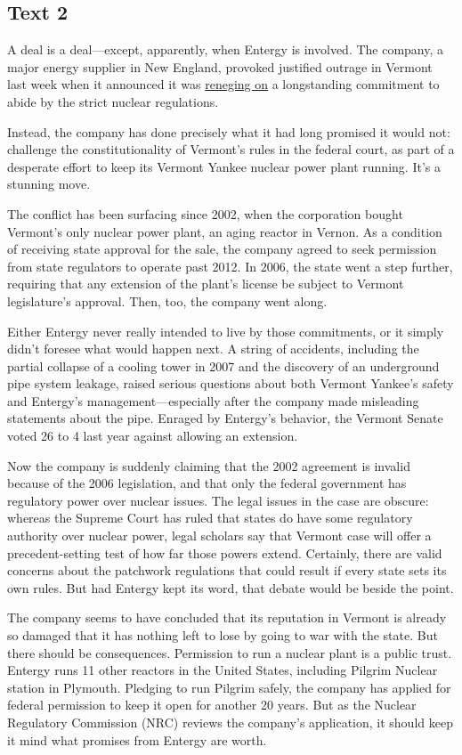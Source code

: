 \newpage
\subsection{Text 2}


A deal is a deal---except, apparently, when Entergy is involved. The
company, a major energy supplier in New England, provoked justified
outrage in Vermont last week when it announced it was
\uline{reneging on} a longstanding commitment to abide by the strict
nuclear regulations.

Instead, the company has done precisely what it had long promised it
would not: challenge the constitutionality of Vermont's rules in the
federal court, as part of a desperate effort to keep its Vermont Yankee
nuclear power plant running. It's a stunning move.

The conflict has been surfacing since 2002, when the corporation bought
Vermont's only nuclear power plant, an aging reactor in Vernon. As a
condition of receiving state approval for the sale, the company agreed
to seek permission from state regulators to operate past 2012. In 2006,
the state went a step further, requiring that any extension of the
plant's license be subject to Vermont legislature's approval. Then, too,
the company went along.

Either Entergy never really intended to live by those commitments, or it
simply didn't foresee what would happen next. A string of accidents,
including the partial collapse of a cooling tower in 2007 and the
discovery of an underground pipe system leakage, raised serious
questions about both Vermont Yankee's safety and Entergy's management---especially after the company made misleading statements about the
pipe. Enraged by Entergy's behavior, the Vermont Senate voted 26 to 4
last year against allowing an extension.

Now the company is suddenly claiming that the 2002 agreement is invalid
because of the 2006 legislation, and that only the federal government
has regulatory power over nuclear issues. The legal issues in the case
are obscure: whereas the Supreme Court has ruled that states do have
some regulatory authority over nuclear power, legal scholars say that
Vermont case will offer a precedent-setting test of how far those powers
extend. Certainly, there are valid concerns about the patchwork
regulations that could result if every state sets its own rules. But had
Entergy kept its word, that debate would be beside the point.

The company seems to have concluded that its reputation in Vermont is
already so damaged that it has nothing left to lose by going to war with
the state. But there should be consequences. Permission to run a nuclear
plant is a public trust. Entergy runs 11 other reactors in the United
States, including Pilgrim Nuclear station in Plymouth. Pledging to run
Pilgrim safely, the company has applied for federal permission to keep
it open for another 20 years. But as the Nuclear Regulatory Commission
(NRC) reviews the company's application, it should keep it mind what
promises from Entergy are worth.

